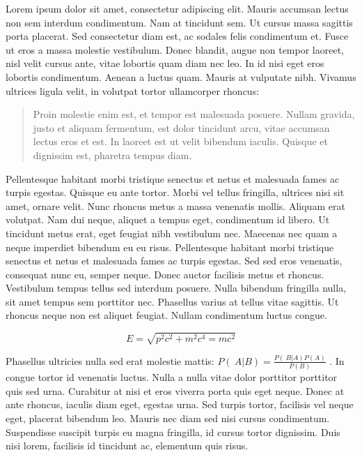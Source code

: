 \documentclass[
    a4paper,%
    DIV=calc,%
    abstract=true%
  ]{scrartcl}%
\begin{document}
  Lorem ipsum dolor sit amet, consectetur adipiscing elit. Mauris
  accumsan lectus non sem interdum condimentum. Nam at tincidunt sem. Ut
  cursus massa sagittis porta placerat. Sed consectetur diam est, ac
  sodales felis condimentum et. Fusce ut eros a massa molestie
  vestibulum. Donec blandit, augue non tempor laoreet, nisl velit cursus
  ante, vitae lobortis quam diam nec leo. In id nisi eget eros lobortis
  condimentum. Aenean a luctus quam. Mauris at vulputate nibh. Vivamus
  ultrices ligula velit, in volutpat tortor ullamcorper rhoncus:

  \begin{quote}
  Proin molestie enim est, et tempor est malesuada posuere. Nullam
  gravida, justo et aliquam fermentum, est dolor tincidunt arcu, vitae
  accumsan lectus eros et est. In laoreet est ut velit bibendum iaculis.
  Quisque et dignissim est, pharetra tempus diam.
  \end{quote}

  Pellentesque habitant morbi tristique senectus et netus et malesuada
  fames ac turpis egestas. Quisque eu ante tortor. Morbi vel tellus
  fringilla, ultrices nisi sit amet, ornare velit. Nunc rhoncus metus a
  massa venenatis mollis. Aliquam erat volutpat. Nam dui neque, aliquet
  a tempus eget, condimentum id libero. Ut tincidunt metus erat, eget
  feugiat nibh vestibulum nec. Maecenas nec quam a neque imperdiet
  bibendum eu eu risus. Pellentesque habitant morbi tristique senectus
  et netus et malesuada fames ac turpis egestas. Sed sed eros venenatis,
  consequat nunc eu, semper neque. Donec auctor facilisis metus et
  rhoncus. Vestibulum tempus tellus sed interdum posuere. Nulla bibendum
  fringilla nulla, sit amet tempus sem porttitor nec. Phasellus varius
  at tellus vitae sagittis. Ut rhoncus neque non est aliquet feugiat.
  Nullam condimentum luctus congue.

  \[E = \sqrt{p^{2}c^{2} + m^{2}c^{4} = mc^{2}}\]

  Phasellus ultricies nulla sed erat molestie mattis:
  \(P\left( \left. \ A \right|B \right) = \frac{P\left( \left. \ B \right|A \right)P(A)}{P(B)}\)
  . In congue tortor id venenatis luctus. Nulla a nulla vitae dolor
  porttitor porttitor quis sed urna. Curabitur at nisi et eros viverra
  porta quis eget neque. Donec at ante rhoncus, iaculis diam eget,
  egestas urna. Sed turpis tortor, facilisis vel neque eget, placerat
  bibendum leo. Mauris nec diam sed nisi cursus condimentum. Suspendisse
  suscipit turpis eu magna fringilla, id cursus tortor dignissim. Duis
  nisi lorem, facilisis id tincidunt ac, elementum quis risus.
\end{document}
